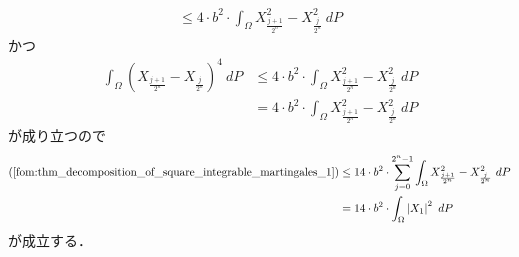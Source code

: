 \begin{sketch}
\begin{description}
\begin{align}
					\leq 4 \cdot b^2 \cdot \int_\Omega X^2_{\frac{j+1}{2^n}} - X^2_{\frac{j}{2^n}}\ dP
				\end{align}
				かつ
				\begin{align}
					\int_\Omega \left(X_{\frac{j+1}{2^n}} - X_{\frac{j}{2^n}}\right)^4\ dP
					&\leq 4 \cdot b^2 \cdot \int_\Omega X^2_{\frac{j+1}{2^n}} - X^2_{\frac{j}{2^n}}\ dP \\
					&= 4 \cdot b^2 \cdot \int_\Omega X^2_{\frac{j+1}{2^n}} - X^2_{\frac{j}{2^n}}\ dP
				\end{align}
				が成り立つので
				\begin{align}
					(\refeq{fom:thm_decomposition_of_square_integrable_martingales_1})
					&\leq 14 \cdot b^2 \cdot \sum_{j=0}^{2^n-1} \int_\Omega X^2_{\frac{j+1}{2^n}} - X^2_{\frac{j}{2^n}}\ dP \\
					&= 14 \cdot b^2 \cdot \int_\Omega \left|X_{1}\right|^2\ dP
				\end{align}
				が成立する．
				

\end{description}
\end{sketch}
